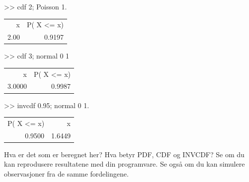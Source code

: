 \begin{enumerate}
\begin{center}
{\begin{minipage}{9cm}
 >> cdf 2; Poisson 1.\\
\begin{tabular}{rr}
         x  &   P( X <= x) \\
      2.00  &      0.9197   \\
\end{tabular}

 >> cdf 3; normal 0  1 \\
\begin{tabular}{rr}
         x  &   P( X <= x) \\
    3.0000  &      0.9987 \\
\end{tabular}

 >> invcdf 0.95; normal 0  1.    \\
\begin{tabular}{rr}
 P( X <= x)  &        x   \\
    0.9500   &     1.6449 \\[0.2cm]
\end{tabular}

\end{minipage}}
\end{center}
Hva er det som er beregnet her? Hva betyr PDF, CDF og INVCDF?
Se om du kan reprodusere resultatene med din programvare.
Se også om du kan simulere observasjoner fra de samme fordelingene.

\end{enumerate}
\normalsize






